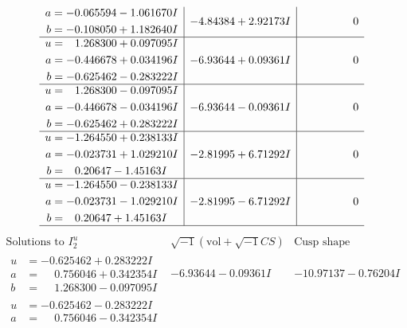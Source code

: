 \documentclass[1p]{elsarticle_modified}
\theoremstyle{definition}
\newcommand{\I}{\sqrt{-1}}
\begin{document}
$$\begin{array}{c|c|c}
\begin{aligned}
a &= -0.065594 - 1.061670 I \\
b &= -0.108050 + 1.182640 I\end{aligned}
 & -4.84384 + 2.92173 I & \phantom{-0.000000 } 0 \\ \hline\begin{aligned}
u &= \phantom{-}1.268300 + 0.097095 I \\
a &= -0.446678 + 0.034196 I \\
b &= -0.625462 - 0.283222 I\end{aligned}
 & -6.93644 + 0.09361 I & \phantom{-0.000000 } 0 \\ \hline\begin{aligned}
u &= \phantom{-}1.268300 - 0.097095 I \\
a &= -0.446678 - 0.034196 I \\
b &= -0.625462 + 0.283222 I\end{aligned}
 & -6.93644 - 0.09361 I & \phantom{-0.000000 } 0 \\ \hline\begin{aligned}
u &= -1.264550 + 0.238133 I \\
a &= -0.023731 + 1.029210 I \\
b &= \phantom{-}0.20647 - 1.45163 I\end{aligned}
 & -2.81995 + 6.71292 I & \phantom{-0.000000 } 0 \\ \hline\begin{aligned}
u &= -1.264550 - 0.238133 I \\
a &= -0.023731 - 1.029210 I \\
b &= \phantom{-}0.20647 + 1.45163 I\end{aligned}
 & -2.81995 - 6.71292 I & \phantom{-0.000000 } 0\\
 \hline 
 \end{array}$$\newpage$$\begin{array}{c|c|c}  
\text{Solutions to }I^u_{2}& \I (\text{vol} + \sqrt{-1}CS) & \text{Cusp shape}\\
 \hline 
\begin{aligned}
u &= -0.625462 + 0.283222 I \\
a &= \phantom{-}0.756046 + 0.342354 I \\
b &= \phantom{-}1.268300 - 0.097095 I\end{aligned}
 & -6.93644 - 0.09361 I & -10.97137 - 0.76204 I \\ \hline\begin{aligned}
u &= -0.625462 - 0.283222 I \\
a &= \phantom{-}0.756046 - 0.342354 I \\

\end{aligned}
\end{array}$$
\end{document}
